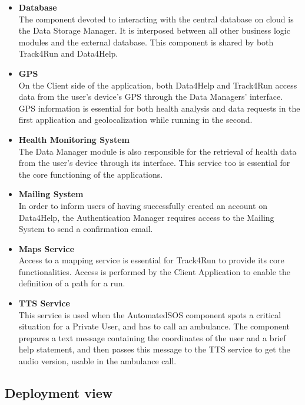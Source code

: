 \documentclass[titlepage]{article}
\begin{document}
\begin{itemize}
        \item {\bf Database }\\
        The component devoted to interacting with the central database on cloud is the Data Storage Manager. It is interposed between all other business logic modules and the external database. This component is shared by both Track4Run and Data4Help.
		\item {\bf GPS }\\
		On the Client side of the application, both Data4Help and Track4Run access data from the user’s device’s GPS through the Data Managers’ interface. GPS information is essential for both health analysis and data requests in the first application and geolocalization while running in the second.
		\item {\bf Health Monitoring System }\\
		The Data Manager module is also responsible for the retrieval of health data from the user’s device through its interface. This service too is essential for the core functioning of the applications.
		\item {\bf Mailing System }\\
		In order to inform users of having successfully created an account on Data4Help, the Authentication Manager requires access to the Mailing System to send a confirmation email.
		\item {\bf Maps Service }\\
		Access to a mapping service is essential for Track4Run to provide its core functionalities. Access is performed by the Client Application to enable the definition of a path for a run.
		\item {\bf TTS Service }\\
		This service is used when the AutomatedSOS component spots a critical situation for a Private User, and has to call an ambulance. The component prepares a text message containing the coordinates of the user and a brief help statement, and then passes this message to the TTS service to get the audio version, usable in the ambulance call.
    \end{itemize} 

\pagebreak

\subsection{Deployment view}
\end{document}
